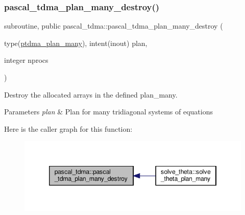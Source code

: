 \subsubsection{\texorpdfstring{pascal\+\_\+tdma\+\_\+plan\+\_\+many\+\_\+destroy()}{pascal\_tdma\_plan\_many\_destroy()}}
{\footnotesize\ttfamily subroutine, public pascal\+\_\+tdma\+::pascal\+\_\+tdma\+\_\+plan\+\_\+many\+\_\+destroy (\begin{DoxyParamCaption}\item[{type(\hyperlink{structpascal__tdma_1_1ptdma__plan__many}{ptdma\+\_\+plan\+\_\+many}), intent(inout)}]{plan,  }\item[{integer}]{nprocs }\end{DoxyParamCaption})}



Destroy the allocated arrays in the defined plan\+\_\+many. 


\begin{DoxyParams}{Parameters}
{\em plan} & Plan for many tridiagonal systems of equations \\
\hline
\end{DoxyParams}
Here is the caller graph for this function\+:
\nopagebreak
\begin{figure}[H]
\begin{center}
\leavevmode
\includegraphics[width=346pt]{namespacepascal__tdma_aceec478e18d25d413a5bd8a174c3fcb8_icgraph}
\end{center}
\end{figure}
\mbox{\label{namespacepascal__tdma_a5dfc2d7c919b47ad364a74d141532a9f}} 
